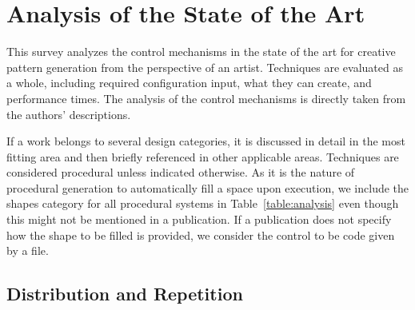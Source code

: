 

\section{Analysis of the State of the Art}
\label{sec:analysis}

This survey analyzes the control mechanisms in the state of the art for creative pattern generation from the perspective of an artist. Techniques are evaluated as a whole, including required configuration input, what they can create, and performance times. The analysis of the control mechanisms is directly taken from the authors' descriptions. 

 


If a work belongs to several design categories, it is discussed in detail in the most fitting area and then briefly referenced in other applicable areas. Techniques are considered procedural unless indicated otherwise. As it is the nature of procedural generation to automatically fill a space upon execution, we include the shapes category for all procedural systems in Table~\ref{table:analysis} even though this might not be mentioned in a publication. 
If a publication does not specify how the shape to be filled is provided, we consider the control to be code given by a file.

\subsection{Distribution and Repetition}
\label{subsec:analysis_distribution_and_repetition}


